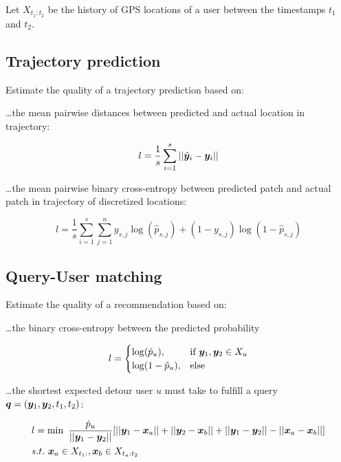 \documentclass{article} %
\begin{document}
Let $X_{t_1:t_2}$ be the history of GPS locations of a user between the timestamps $t_1$ and $t_2$.

\subsection{Trajectory prediction}

Estimate the quality of a trajectory prediction based on:

\dots the mean pairwise distances between predicted and actual location in trajectory:

\begin{equation}
    l = \frac{1}{s} \sum_{i=1}^{s} ||\hat{{\bm{y}}}_i - {\bm{y}}_i||
\end{equation}

\dots the mean pairwise binary cross-entropy between predicted patch and actual patch in trajectory of discretized locations:

\begin{equation}
    l = \frac{1}{s} \sum_{i=1}^{s} \sum_{j=1}^{n} y_{s,j}\log(\hat{p}_{s,j})+
    (1-y_{s,j})\log(1-\hat{p}_{s,j})
\end{equation}

\subsection{Query-User matching}

Estimate the quality of a recommendation based on:

\dots the binary cross-entropy between the predicted probability

\begin{equation}
    l =
    \begin{cases}
        \log(\hat{p}_u),   & \textrm{if} \ {\bm{y}}_1, {\bm{y}}_2 \in X_u \\
        \log(1-\hat{p}_u), & \textrm{else}
    \end{cases}
\end{equation}

\dots the shortest expected detour user $u$ must take to fulfill a query ${\bm{q}}=({\bm{y}}_1, {\bm{y}}_2, t_1, t_2)$:

\begin{align}
     & l     = \min  \ \frac{\hat{p}_u}{||{\bm{y}}_{1} - {\bm{y}}_{2}||}  [||{\bm{y}}_{1} - {\bm{x}}_{a}|| + ||{\bm{y}}_{2} - {\bm{x}}_{b}|| + ||{\bm{y}}_{1} - {\bm{y}}_{2}|| - ||{\bm{x}}_{a} - {\bm{x}}_{b}||] \\
     & s.t.  \ {\bm{x}}_a \in X_{t_1:}, {\bm{x}}_b \in X_{t_a:t_2}
\end{align}
\end{document}
